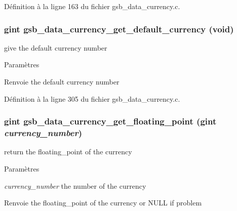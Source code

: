 Définition à la ligne 163 du fichier gsb\_\-data\_\-currency.c.

\subsubsection[{gsb\_\-data\_\-currency\_\-get\_\-default\_\-currency}]{\setlength{\rightskip}{0pt plus 5cm}gint gsb\_\-data\_\-currency\_\-get\_\-default\_\-currency (void)}\label{gsb__data__currency_8h_a8f8303b11d4aa9962d2dfd5d8c4962cb}
give the default currency number


\begin{DoxyParams}{Paramètres}
\item[{\em }]\end{DoxyParams}
\begin{DoxyReturn}{Renvoie}
the default currency number 
\end{DoxyReturn}


Définition à la ligne 305 du fichier gsb\_\-data\_\-currency.c.

\subsubsection[{gsb\_\-data\_\-currency\_\-get\_\-floating\_\-point}]{\setlength{\rightskip}{0pt plus 5cm}gint gsb\_\-data\_\-currency\_\-get\_\-floating\_\-point (gint {\em currency\_\-number})}\label{gsb__data__currency_8h_ae61136d9086c83d0fc0c8ea42e463c11}
return the floating\_\-point of the currency


\begin{DoxyParams}{Paramètres}
\item[{\em currency\_\-number}]the number of the currency\end{DoxyParams}
\begin{DoxyReturn}{Renvoie}
the floating\_\-point of the currency or NULL if problem 
\end{DoxyReturn}


